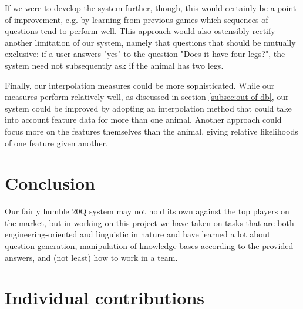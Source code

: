\documentclass[11pt,a4paper]{article}
\begin{document}
If we were to develop the system further, though, this would certainly be a point of improvement, e.g. by learning from previous games which sequences of questions tend to perform well. This approach would also ostensibly rectify another limitation of our system, namely that questions that should be mutually exclusive: if a user answers "yes" to the question "Does it have four legs?", the system need not subsequently ask if the animal has two legs. 

Finally, our interpolation measures could be more sophisticated. While our measures perform relatively well, as discussed in section \ref{subsec:out-of-db}, our system could be improved by adopting an interpolation method that could take into account feature data for more than one animal. Another approach could focus more on the features themselves than the animal, giving relative likelihoods of one feature given another. 


\section{Conclusion}
\label{sec:concl}

Our fairly humble 20Q system may not hold its own against the top players on the market, but in working on this project we have taken on tasks that are both engineering-oriented and linguistic in nature and have learned a lot about question generation, manipulation of knowledge bases according to the provided answers, and (not least) how to work in a team. 





\appendix

\section{Individual contributions}
\label{app:contributions}
\end{document}
